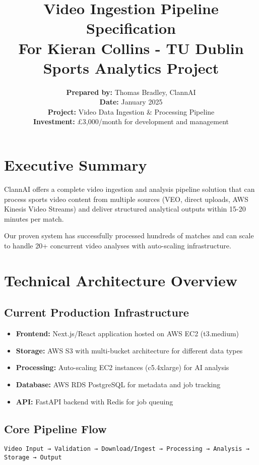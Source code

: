 \documentclass[11pt,a4paper]{article}
\title{
    \vspace{-2cm}
    {\Huge\bfseries\color{clannblue} Video Ingestion Pipeline Specification}\\[0.5cm]
    {\Large\color{darkgray} For Kieran Collins - TU Dublin Sports Analytics Project}
}
\author{
    \textbf{Prepared by:} Thomas Bradley, ClannAI\\
    \textbf{Date:} January 2025\\
    \textbf{Project:} Video Data Ingestion \& Processing Pipeline\\
    \textbf{Investment:} £3,000/month for development and management
}
\date{}
\begin{document}
\maketitle

\vspace{1cm}

\section{Executive Summary}

ClannAI offers a complete video ingestion and analysis pipeline solution that can process sports video content from multiple sources (VEO, direct uploads, AWS Kinesis Video Streams) and deliver structured analytical outputs within 15-20 minutes per match.

Our proven system has successfully processed hundreds of matches and can scale to handle 20+ concurrent video analyses with auto-scaling infrastructure.

\section{Technical Architecture Overview}

\subsection{Current Production Infrastructure}
\begin{itemize}[leftmargin=1.5cm]
    \item \textbf{Frontend:} Next.js/React application hosted on AWS EC2 (t3.medium)
    \item \textbf{Storage:} AWS S3 with multi-bucket architecture for different data types
    \item \textbf{Processing:} Auto-scaling EC2 instances (c5.4xlarge) for AI analysis
    \item \textbf{Database:} AWS RDS PostgreSQL for metadata and job tracking
    \item \textbf{API:} FastAPI backend with Redis for job queuing
\end{itemize}

\subsection{Core Pipeline Flow}
\begin{center}
\texttt{Video Input → Validation → Download/Ingest → Processing → Analysis → Storage → Output}
\end{center}
\end{document}
